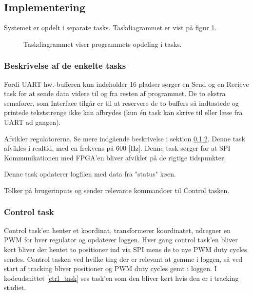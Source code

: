 %
\subsection{Implementering}
% 
% 

Systemet er opdelt i separate tasks.
Taskdiagrammet er vist på figur \ref{fig:task_diagram}. 

\begin{figure}[!h]
\centering
\begin{tikzpicture}[node distance = 3.2cm]
	
\end{tikzpicture}
\caption[Taskdiagram]{Taskdiagrammet viser programmets opdeling i tasks.}
\label{fig:task_diagram}
\end{figure}

\subsubsection{Beskrivelse af de enkelte tasks}
\begin{description}
\itemsep-3pt
	\item[UART send og -receive] Fordi UART hw.-bufferen kun indeholder 16 pladser \citep[Side. 430]{lm3s6965}
	sørger en Send og en Recieve task for at sende data videre til og fra resten af programmet.
	De to ekstra semaforer, som Interface tilgår er til at reservere de to buffers så indtastede og
	printede tekststrenge ikke kan afbrydes (kun én task kan skrive til eller læse fra UART ad gangen).
	\item[Control] Afvikler regulatorerne. Se mere indgående beskrivelse i sektion \ref{sec:control_task}.
	Denne task afvikles i realtid, med en frekvens på 600 [Hz]. 
	Denne task sørger for at SPI Kommunikationen med FPGA'en bliver afviklet på de rigtige tidspunkter.
	\item[Logger] Denne task opdaterer logfilen med data fra "status" køen.
	\item[Interface] Tolker på brugerinputs og sender relevante kommandoer til Control tasken.
\end{description}


\subsubsection{Control task}
\label{sec:control_task}
Control task'en henter et koordinat, transformerer koordinatet, udregner en PWM for hver regulator og opdaterer loggen.
Hver gang control task'en bliver kørt bliver der hentet to positioner ind via SPI mens de to nye PWM duty cycles sendes.
Control tasken ved hvilke ting der er relevant at gemme i loggen,
så ved start af tracking bliver positioner og PWM duty cycles gemt i loggen.
I kodeudsnittet \ref{ctrl_task} ses task'en som den bliver kørt hvis den er i tracking stadiet.

